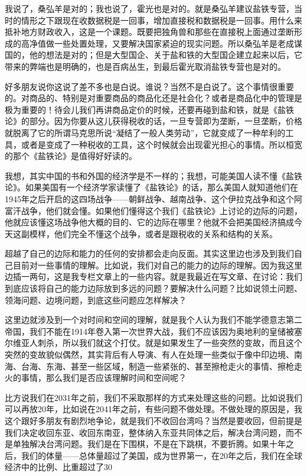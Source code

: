 \documentclass[UTF8, 12pt, a4paper]{ctexrep}
\begin{document}
我说了，桑弘羊是对的；我也说了，霍光也是对的。就是桑弘羊建议盐铁专营，当时的情形之下跟现在收数据税是一回事，增加直接税和数据税是一回事。用什么来抵补地方财政收入，这是一个课题。既要把独角兽和那些在直接税上面通过垄断形成的高净值做一些处置处理，又要解决国家紧迫的现实问题。所以桑弘羊是老成谋国的，他的想法是对的；但是大型国企、关于盐和铁的大型国企建立起来以后，它带来的弊端也是明确的，也是百病丛生，到最后霍光取消盐铁专营也是对的。

好多朋友说你这说了差不多也是白说。谁说？当然不是白说了。这个事情很重要的。对商品的、特别是对重要商品的商品化还是社会化？或者是商品化中的管理是极为重要的！待会儿我们再讲商品定价的时候，还要再碰到盐和铁，就是《盐铁论》的部分。因为你要从这儿获得税收的话，一旦专营即为垄断，一旦垄断，价格就脱离了它的所谓马克思所说“凝结了一般人类劳动”，它就变成了一种牟利的工具，或者是变成了一种税收的工具，这个时候就会出现霍光担心的事情。所以桓宽的那个《盐铁论》是值得好好读的。

我想，其实中国的书和外国的经济学是不一样的；我想，可能美国人读不懂《盐铁论》。如果美国有一个经济学家读懂了《盐铁论》的话，那么美国人就知道他们在1945年之后开启的这四场战争——朝鲜战争、越南战争、这个伊拉克战争和这个阿富汗战争，他们就会懂。如果他们懂得这个我们《盐铁论》上讨论的边际的问题，他就应该懂这场战争他大概的目的、它的边际在哪里？他就不会把美国经济搞成今天这副模样，他们完全不懂这个战争，或者是跟税收的关系和结构的关系。

超越了自己的边际和能力的任何的安排都会走向反面。其实这里边也涉及到我们自己目前对一些事情的理解。比如说，我们对自己的能力的边际的理解。因为我这里边插一两句，这是我专栏文章上的一些内容。就是我最近在写文章、在讨论：我们到底应该将自己的能力边际放到多远的问题？要解决什么问题？比如说领土问题、领海问题、边境问题，到底这些问题应怎样解决？

这里边就涉及到一个对时间和空间的理解，就是我个人认为我们不能学德意志第二帝国，我们不能在1914年卷入第一次世界大战，我们不应该因为奥地利的皇储被塞尔维亚人刺杀，所以我们就这个打仗。就是如果发生了一些突然的变故，而且这个突然的变故貌似偶然，其实背后有人导演、有人在处理一些类似于像中印边境、南海、台海、东海、甚至一些区域，制造一些紧张的、甚至擦枪走火的事情、擦枪走火的事情，那么我们是否应该理解时间和空间呢？

比方说我们在2031年之前，我们不采取那样的方式来处理这些的问题。比如说我们可以再放20年，比如说在2041年之前，有些问题不做处理。不做处理的原因是，我这个跟好多朋友有剧烈地争论，就是我们不收回台湾吗？当然是要收回，但前提是我们决定收回东亚、收回东南亚，整体纳入东亚共同体之后，解决台湾问题，而不是单独解决台湾问题。我们是在下围棋，不是在下跳棋，不要折腾。如果十年之后，我们的体量——总体量超过了美国，成为世界第一，在20年之后，我们在全球经济中的比例、比重超过了30%
\end{document}
